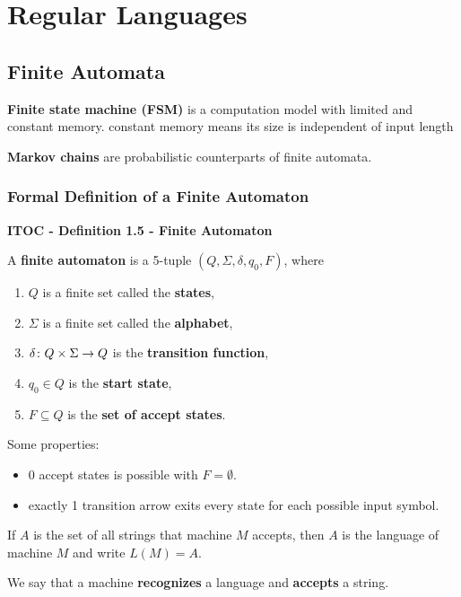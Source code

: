 \section{Regular Languages}

\subsection{Finite Automata}

\textbf{Finite state machine (FSM)} is a computation model with limited and constant memory. 
{\color{blue} constant memory means its size is independent of input length}

\textbf{Markov chains} are probabilistic counterparts of finite automata.

\subsubsection{Formal Definition of a Finite Automaton}

\begin{shaded}
\textbf{ITOC - Definition 1.5 - Finite Automaton}

\medskip
A \textbf{finite automaton} is a 5-tuple $(Q, \Sigma, \delta, q_0, F)$, where
\begin{enumerate}
\item $Q$ is a finite set called the \textbf{states},
\item $\Sigma$ is a finite set called the \textbf{alphabet},
\item $\delta\colon Q \times \Sigma\rightarrow Q$ is the \textbf{transition function},
\item $q_0 \in Q$ is the \textbf{start state},
\item $F \subseteq Q$ is the \textbf{set of accept states}.
\end{enumerate}
\end{shaded}

Some properties:
\begin{itemize}
\item 0 accept states is possible with $F = \emptyset$.
\item exactly 1 transition arrow exits every state for each possible input symbol.
\end{itemize}

If $A$ is the set of all strings that machine $M$ accepts, then $A$ is the
language of machine $M$ and write $L(M) = A$.

We say that a machine \textbf{recognizes} a language and \textbf{accepts} a string.


